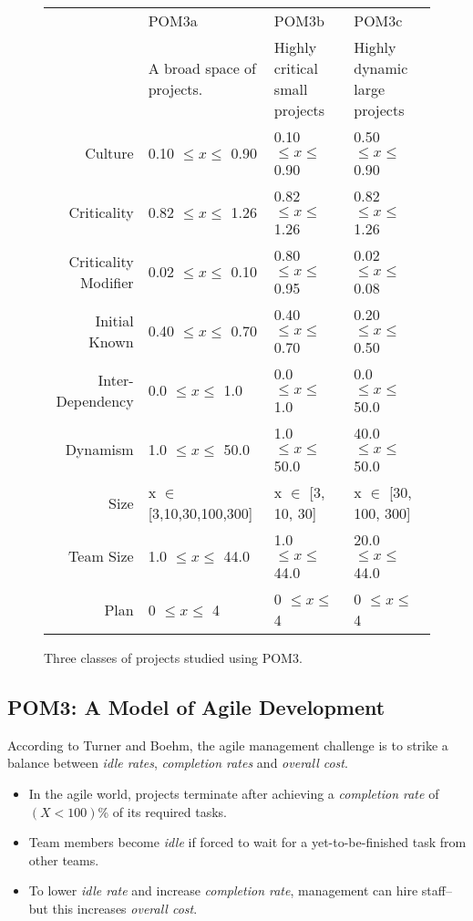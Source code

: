 \documentclass[10pt,journal,compsoc]{IEEEtran}
\newcommand{\bi}{\begin{itemize}}
\newcommand{\ei}{\end{itemize}}
\begin{document}
\begin{figure*}%
\footnotesize
\begin{center}
    \begin{tabular}{r|p{1.5in}|p{1.5in}|p{1.5in}}
                     & POM3a                         & POM3b             &POM3c       \\ 
                             & A broad space of projects. & Highly critical small projects& Highly dynamic large projects\\\hline
        Culture              & 0.10 $\leq x \leq$ 0.90       & 0.10 $\leq x \leq$ 0.90  & 0.50 $\leq x \leq$ 0.90  \\ 
        Criticality          & 0.82 $\leq x \leq$ 1.26       & 0.82 $\leq x \leq$ 1.26   & 0.82 $\leq x \leq$ 1.26  \\ 
        Criticality Modifier & 0.02 $\leq x \leq$ 0.10       & 0.80 $\leq x \leq$ 0.95 & 0.02 $\leq x \leq$ 0.08   \\ 
        Initial Known        & 0.40 $\leq x \leq$ 0.70       & 0.40 $\leq x \leq$ 0.70  & 0.20 $\leq x \leq$ 0.50  \\ 
        Inter-Dependency     & 0.0   $\leq x \leq$ 1.0       & 0.0   $\leq x \leq$ 1.0  & 0.0   $\leq x \leq$ 50.0 \\ 
        Dynamism             & 1.0   $\leq x \leq$ 50.0      & 1.0   $\leq x \leq$ 50.0  & 40.0   $\leq x \leq$ 50.0 \\ 
        Size                 & x $\in$ [3,10,30,100,300] & x $\in$ [3, 10, 30]     & x $\in$ [30, 100, 300]   \\ 
        Team Size            & 1.0 $\leq x \leq$ 44.0        & 1.0 $\leq x \leq$ 44.0  & 20.0 $\leq x \leq$ 44.0    \\ 
        Plan                 & 0 $\leq x \leq$ 4             & 0 $\leq x \leq$ 4    & 0 $\leq x \leq$ 4       
\end{tabular}
\end{center}

\caption{Three classes of projects studied using POM3. }\label{fig:POM3abcd}
\end{figure*}




\subsection{POM3: A Model of Agile Development}\label{sec:pom3pom3} 
According to Turner and Boehm,  the agile management challenge is to strike a balance between {\em idle rates}, {\em completion rates} and {\em overall cost}. 
\bi
\item
In the agile world, projects terminate after achieving a {\em completion rate} of   $(X<100)$\% of its required tasks.
\item
Team members  become {\em idle} if forced to wait for a yet-to-be-finished task from other teams. 
\item
To lower {\em idle rate} and increase {\em completion rate}, management can hire staff--but this increases  {\em overall cost}.
\ei 
\end{document}
